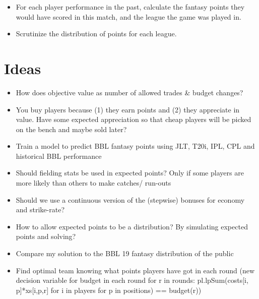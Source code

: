 \documentclass[10pt]{article}
\begin{document}
\begin{itemize}
    \item For each player performance in the past, calculate the fantasy points they would have scored in this match, and the league the game was played in.
    \item Scrutinize the distribution of points for each league.
\end{itemize}

\section{Ideas}
\begin{itemize}
    \item How does objective value as number of allowed trades \& budget changes?
    \item You buy players because (1) they earn points and (2) they appreciate in value. Have some expected appreciation so that cheap players will be picked on the bench and maybe sold later?
    \item Train a model to predict BBL fantasy points using JLT, T20i, IPL, CPL and historical BBL performance
    \item Should fielding stats be used in expected points? Only if some players are more likely than others to make catches/ run-outs
    \item Should we use a continuous version of the (stepwise) bonuses for economy and strike-rate?
    \item How to allow expected points to be a distribution? By simulating expected points and solving?
    \item Compare my solution to the BBL 19 fantasy distribution of the public
    \item Find optimal team knowing what points players have got in each round (new decision variable for budget in each round for r in rounds: pl.lpSum(costs[i, p]*xs[i,p,r] for i in players for p in positions) == budget(r)) 
\end{itemize}
\end{document}
